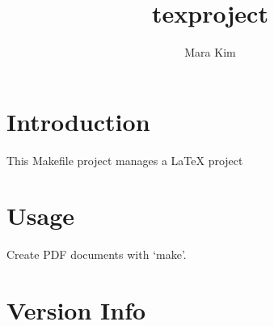 \documentclass{article}
\author{Mara Kim}
\title{texproject}
\begin{document}
\maketitle
\tableofcontents
\section{Introduction}
This Makefile project manages a \LaTeX{} project
\section{Usage}
Create PDF documents with `make'.
\section{Version Info}

\end{document}
